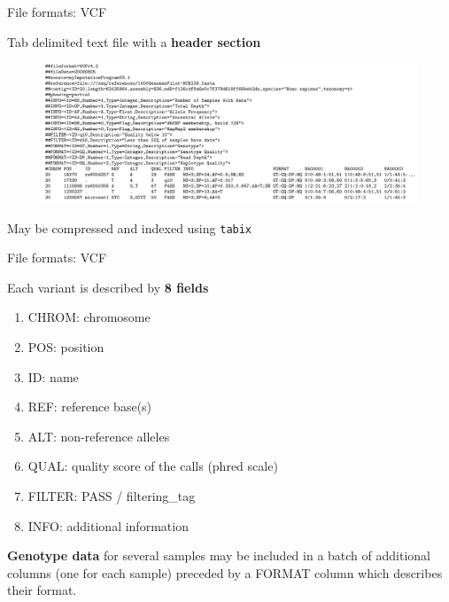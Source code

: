 \begin{frame}{File formats: VCF}

Tab delimited text file with a \textbf{header section}

\begin{figure}[htbp]
\centering
\includegraphics[width=\textwidth,height=0.8\textheight,keepaspectratio]{images/vcf.png}
\end{figure}

May be compressed and indexed using \texttt{tabix}

\end{frame}

\begin{frame}{File formats: VCF}

Each variant is described by \textbf{8 fields}

\begin{enumerate}
\def\labelenumi{\arabic{enumi}.}
\item
  CHROM: chromosome
\item
  POS: position
\item
  ID: name
\item
  REF: reference base(s)
\item
  ALT: non-reference alleles
\item
  QUAL: quality score of the calls (phred scale)
\item
  FILTER: PASS / filtering\_tag
\item
  INFO: additional information
\end{enumerate}

\textbf{Genotype data} for several samples may be included in a batch of
additional columns (one for each sample) preceded by a FORMAT column
which describes their format.

\end{frame}

